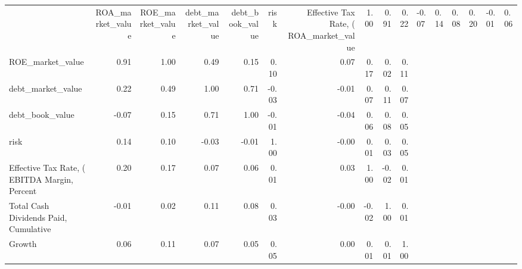 \begin{tabular}{lrrrrrrrrr}
\toprule
 & ROA_market_value & ROE_market_value & debt_market_value & debt_book_value & risk & Effective Tax Rate, (%
\midrule
ROA_market_value & 1.00 & 0.91 & 0.22 & -0.07 & 0.14 & 0.08 & 0.20 & -0.01 & 0.06 \\
ROE_market_value & 0.91 & 1.00 & 0.49 & 0.15 & 0.10 & 0.07 & 0.17 & 0.02 & 0.11 \\
debt_market_value & 0.22 & 0.49 & 1.00 & 0.71 & -0.03 & -0.01 & 0.07 & 0.11 & 0.07 \\
debt_book_value & -0.07 & 0.15 & 0.71 & 1.00 & -0.01 & -0.04 & 0.06 & 0.08 & 0.05 \\
risk & 0.14 & 0.10 & -0.03 & -0.01 & 1.00 & -0.00 & 0.01 & 0.03 & 0.05 \\
Effective Tax Rate, (%
EBITDA Margin, Percent & 0.20 & 0.17 & 0.07 & 0.06 & 0.01 & 0.03 & 1.00 & -0.02 & 0.01 \\
Total Cash Dividends Paid, Cumulative & -0.01 & 0.02 & 0.11 & 0.08 & 0.03 & -0.00 & -0.02 & 1.00 & 0.01 \\
Growth & 0.06 & 0.11 & 0.07 & 0.05 & 0.05 & 0.00 & 0.01 & 0.01 & 1.00 \\
\bottomrule
\end{tabular}
